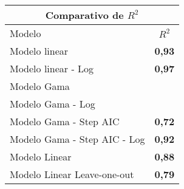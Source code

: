 \documentclass{article}
\begin{document}
\begin{table}[]
	\centering
	\begin{tabular}{lc}
		\hline
		\multicolumn{2}{c}{\textbf{Comparativo de $R^{2}$}} \\ \hline
		Modelo                         & \textbf{$R^{2}$}   \\ \hline
		Modelo linear                  & \textbf{0,93}      \\
		Modelo linear - Log            & \textbf{0,97}      \\
		Modelo Gama                    & \textbf{}          \\
		Modelo Gama - Log              & \textbf{}          \\
		Modelo Gama - Step AIC         & \textbf{0,72}      \\
		Modelo Gama - Step AIC - Log   & \textbf{0,92}      \\
		Modelo Linear                  & \textbf{0,88}      \\
		Modelo Linear Leave-one-out    & \textbf{0,79}      \\ \hline
	\end{tabular}
\end{table}
\end{document}
